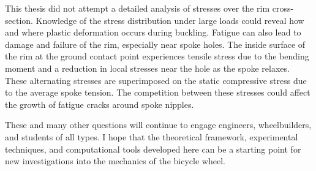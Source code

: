 \documentclass[\rootdir/thesis.tex]{subfiles}
\begin{document}
This thesis did not attempt a detailed analysis of stresses over the rim cross-section. Knowledge of the stress distribution under large loads could reveal how and where plastic deformation occurs during buckling. Fatigue can also lead to damage and failure of the rim, especially near spoke holes. The inside surface of the rim at the ground contact point experiences tensile stress due to the bending moment and a reduction in local stresses near the hole as the spoke relaxes. These alternating stresses are superimposed on the static compressive stress due to the average spoke tension. The competition between these stresses could affect the growth of fatigue cracks around spoke nipples.

These and many other questions will continue to engage engineers, wheelbuilders, and students of all types. I hope that the theoretical framework, experimental techniques, and computational tools developed here can be a starting point for new investigations into the mechanics of the bicycle wheel.
\end{document}
